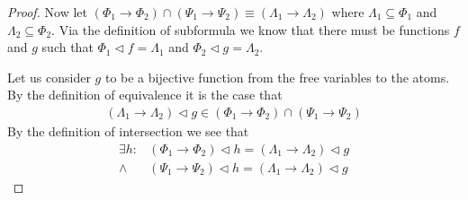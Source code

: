 \documentclass{article}
\begin{document}
\begin{proof}
Now let $(\Phi_1 \rightarrow \Phi_2) \cap (\Psi_1 \rightarrow \Psi_2) \equiv (\Lambda_1 \rightarrow \Lambda_2)$ where $\Lambda_1 \subseteq \Phi_1$ and $\Lambda_2 \subseteq \Phi_2$.
Via the definition of subformula we know that there must be functions $f$ and $g$ such that $\Phi_1 \lhd f = \Lambda_1$ and $\Phi_2 \lhd g = \Lambda_2$.

Let us consider $g$ to be a bijective function from the free variables to the atoms.
By the definition of equivalence it is the case that
\begin{align*}
(\Lambda_1 \rightarrow \Lambda_2) \lhd g \in (\Phi_1 \rightarrow \Phi_2) \cap (\Psi_1 \rightarrow \Psi_2)
\end{align*}
By the definition of intersection we see that
\begin{align*}
\exists h : &(\Phi_1 \rightarrow \Phi_2) \lhd h = (\Lambda_1 \rightarrow \Lambda_2) \lhd g  \\
\land       &(\Psi_1 \rightarrow \Psi_2) \lhd h = (\Lambda_1 \rightarrow \Lambda_2) \lhd g  
\end{align*}
\end{proof}
\end{document}
